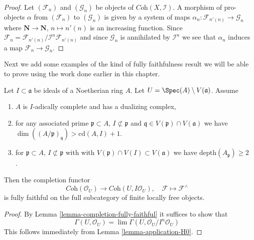 \begin{proof}
Let $(\mathcal{F}_n)$ and $(\mathcal{G}_n)$ be objects of
$\textit{Coh}(X, \mathcal{I})$. A morphism of pro-objects
$\alpha$ from $(\mathcal{F}_n)$ to $(\mathcal{G}_n)$ is given
by a system of maps
$\alpha_n : \mathcal{F}_{n'(n)} \to \mathcal{G}_n$
where $\mathbf{N} \to \mathbf{N}$, $n \mapsto n'(n)$
is an increasing function. Since
$\mathcal{F}_n = \mathcal{F}_{n'(n)}/\mathcal{I}^n\mathcal{F}_{n'(n)}$
and since $\mathcal{G}_n$ is annihilated by $\mathcal{I}^n$
we see that $\alpha_n$ induces a map $\mathcal{F}_n \to \mathcal{G}_n$.
\end{proof}

\noindent
Next we add some examples of the kind of fully faithfulness
result we will be able to prove using the work done earlier in this chapter.

\begin{lemma}
\label{lemma-fully-faithful}
Let $I \subset \mathfrak a$ be ideals of a Noetherian ring $A$.
Let $U = \Spec(A) \setminus V(\mathfrak a)$. Assume
\begin{enumerate}
\item $A$ is $I$-adically complete and has a dualizing complex,
\item for any associated prime $\mathfrak p \subset A$,
$I \not \subset \mathfrak p$ and
$\mathfrak q \in V(\mathfrak p) \cap V(\mathfrak a)$ we have
$\dim((A/\mathfrak p)_\mathfrak q) > \text{cd}(A, I) + 1$.
\item for $\mathfrak p \subset A$, $I \not \subset \mathfrak p$ with
with $V(\mathfrak p) \cap V(I) \subset V(\mathfrak a)$
we have $\text{depth}(A_\mathfrak p) \geq 2$.
\end{enumerate}
Then the completion functor
$$
\textit{Coh}(\mathcal{O}_U)
\longrightarrow
\textit{Coh}(U, I\mathcal{O}_U),
\quad
\mathcal{F} \longmapsto \mathcal{F}^\wedge
$$
is fully faithful on the full subcategory of
finite locally free objects.
\end{lemma}

\begin{proof}
By Lemma \ref{lemma-completion-fully-faithful}
it suffices to show that
$$
\Gamma(U, \mathcal{O}_U) =
\lim \Gamma(U, \mathcal{O}_U/I^n\mathcal{O}_U)
$$
This follows immediately from
Lemma \ref{lemma-application-H0}.
\end{proof}

